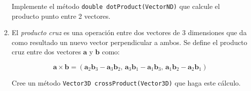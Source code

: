 \begin{Exercise}[title={Algebra vectorial}]
\begin{enumerate}
        Implemente el método \texttt{double dotProduct(VectorND)} que calcule
        el producto punto entre 2 vectores.
      
      \item El \textit{producto cruz} es una operación entre dos vectores de 3 dimensiones 
        que da como resultado un nuevo vector perpendicular a ambos.
        Se define el producto cruz entre dos vectores \(\mathbf{a}\) y \(\mathbf{b}\) 
        como:

        \[  
          \mathbf{a} \times \mathbf{b} = \left(
            \mathbf{a}_2 \mathbf{b}_3 - \mathbf{a}_3 \mathbf{b}_2,\,
            \mathbf{a}_3 \mathbf{b}_1 - \mathbf{a}_1 \mathbf{b}_3,\,
            \mathbf{a}_1 \mathbf{b}_2 - \mathbf{a}_2 \mathbf{b}_1
            \right)
        \]

        Cree un método \texttt{Vector3D crossProduct(Vector3D)} que haga este 
        cálculo.
    \end{enumerate}
  \end{Exercise}

